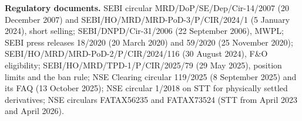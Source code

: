 {\sloppy\noindent\textbf{Regulatory documents.} SEBI circular MRD/DoP/SE/Dep/Cir-14/2007 (20 December 2007) and
SEBI/HO/MRD/MRD-PoD-3/P/CIR/2024/1 (5 January 2024), short selling; SEBI/DNPD/Cir-31/2006 (22 September 2006), MWPL; SEBI
press releases 18/2020 (20 March 2020) and 59/2020 (25 November 2020); SEBI/HO/MRD/MRD-PoD-2/P/CIR/2024/116 (30 August
2024), F\&O eligibility; SEBI/HO/MRD/TPD-1/P/CIR/2025/79 (29 May 2025), position limits and the ban rule; NSE Clearing
circular 119/2025 (8 September 2025) and its FAQ (13 October 2025); NSE circular 1/2018 on STT for physically settled
derivatives; NSE circulars FATAX56235 and FATAX73524 (STT from April 2023 and April 2026).\par}
